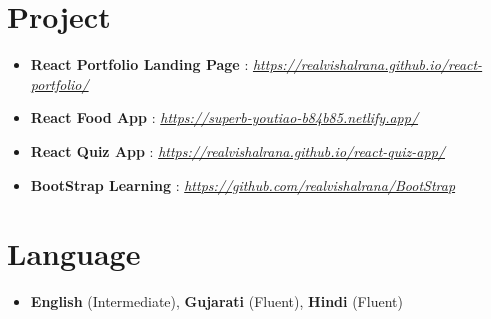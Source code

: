 \documentclass{muratcan_cv}
\begin{document}
\section{Project}
\vspace{6pt}
\begin{itemize}
\item \textbf{React Portfolio Landing Page} : \href{https://realvishalrana.github.io/react-portfolio/}{\textit{https://realvishalrana.github.io/react-portfolio/}} \vspace{4pt}
\item \textbf{React Food App} : \href{https://superb-youtiao-b84b85.netlify.app/}{\textit{https://superb-youtiao-b84b85.netlify.app/}} \vspace{4pt}
\item \textbf{React Quiz App} : \href{https://realvishalrana.github.io/react-quiz-app/}{\textit{https://realvishalrana.github.io/react-quiz-app/}} \vspace{4pt}
\item \textbf{BootStrap Learning} : \href{https://github.com/realvishalrana/BootStrap}{\textit{https://github.com/realvishalrana/BootStrap}} \vspace{4pt}
\end{itemize}


\section{Language}
\vspace{6pt}
\begin{itemize}
\item \textbf{English} (Intermediate), \textbf{Gujarati} (Fluent), \textbf{Hindi} (Fluent) \vspace{4pt}
\vspace{6pt}		
\end{itemize}

%
\end{document}
